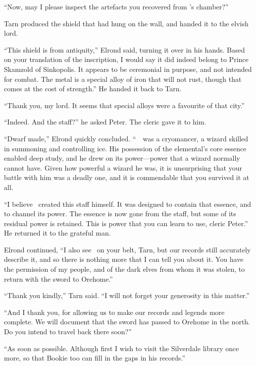 ``Now, may I please inspect the artefacts you recovered from \mothzam's chamber?''

Tarn produced the shield that had hung on the wall, and handed it to the elvish lord.

``This shield is from antiquity,'' Elrond said, turning it over in his hands.  Based on your translation of the inscription, I would say it did indeed belong to Prince Skamzold of Sinkopolis.  It appears to be ceremonial in purpose, and not intended for combat.  The metal is a special alloy of iron that will not rust, though that comes at the cost of strength.''  He handed it back to Tarn.

``Thank you, my lord.  It seems that special alloys were a favourite of that city.''

``Indeed.  And the staff?''  he asked Peter.  The cleric gave it to him.

``Dwarf made,'' Elrond quickly concluded.  ``\mothzam\ \driktur\ was a cryomancer, a wizard skilled in summoning and controlling ice.  His possession of the elemental's core essence enabled deep study, and he drew on its power---power that a wizard normally cannot have.  Given how powerful a wizard he was, it is unsurprising that your battle with him was a deadly one, and it is commendable that you survived it at all.

``I believe \mothzam\ created this staff himself.  It was designed to contain that essence, and to channel its power.  The essence is now gone from the staff, but some of its residual power is retained.  This is power that you can learn to use, cleric Peter.''  He returned it to the grateful man.

Elrond continued, ``I also see \kildir\ on your belt, Tarn, but our records still accurately describe it, and so there is nothing more that I can tell you about it.  You have the permission of my people, and of the dark elves from whom it was stolen, to return with the sword to Orehome.''

``Thank you kindly,'' Tarn said.  ``I will not forget your generosity in this matter.''

``And I thank you, for allowing us to make our records and legends more complete.  We will document that the sword has passed to Orehome in the north.  Do you intend to travel back there soon?''

``As soon as possible.  Although first I wish to visit the Silverdale library once more, so that Bookie too can fill in the gaps in his records.''

